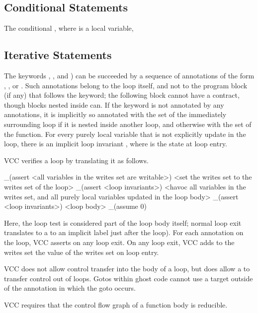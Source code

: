 \documentclass[preprint,nocopyrightspace]{sigplanconf}
\begin{document}
{{{{\begin{VCC}
\subsection{Conditional Statements}
The conditional , where  is a local
variable,

\subsection{Iterative Statements}
The keywords , , and ) 
can be succeeded by a sequence of annotations of the form 
, , or 
. Such annotations belong to the loop itself, and
not to the program block (if any) that follows the keyword; the
following block cannot have a contract, though blocks nested inside
can. If the keyword is not annotated by any  annotations,
it is implicitly so annotated with the  set of the
immediately surrounding loop if it is nested inside another loop, and
otherwise with the  set of the function. For every
purely local variable  that is not explicitly update in the
loop, there is an implicit loop invariant ,
where  is the state at loop entry.

VCC verifies a loop by translating it as follows. 

\begin{VCC}
_(assert <all variables in the writes set are writable>)
<set the writes set to the writes set of the loop>
_(assert <loop invariants>)
<havoc all variables in the writes set, and all purely local variables
 updated in the loop body>
_(assert <loop invariants>)
<loop body>
_(assume 0)

\end{VCC}

Here, the loop test is considered part of the loop body itself; normal
loop exit translates to a  to an implicit label just after the
loop). For each annotation  on the loop, VCC asserts 
 on any loop exit. On any loop exit, VCC adds to the writes set
the value of the writes set on loop entry.

VCC does not allow control transfer into the body of a loop, but does
allow a  to transfer control out of loops.
Gotos within ghost code cannot use a target outside of
the  annotation in which the goto occurs.

VCC requires that the control flow graph of a function body is
reducible. 


\end{VCC}}}}}
\end{document}
